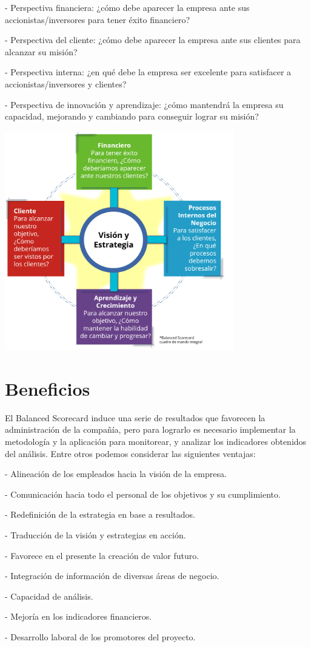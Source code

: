 \item - Perspectiva financiera: ¿cómo debe aparecer la empresa ante sus accionistas/inversores para tener éxito financiero?
\item - Perspectiva del cliente: ¿cómo debe aparecer la empresa ante sus clientes para alcanzar su misión?
\item - Perspectiva interna: ¿en qué debe la empresa ser excelente para satisfacer a accionistas/inversores y clientes?
\item - Perspectiva de innovación y aprendizaje: ¿cómo mantendrá la empresa su capacidad, mejorando y cambiando para conseguir lograr su misión?

\begin{center}
\includegraphics[width=10cm]{./Imagenes/img4}
\end{center}

\section{Beneficios} 
\item{El Balanced Scorecard induce una serie de resultados que favorecen la administración de la compañía, pero para lograrlo es necesario implementar la metodología y la aplicación para monitorear, y analizar los indicadores obtenidos del análisis. Entre otros podemos considerar las siguientes ventajas:}
\\

\item - Alineación de los empleados hacia la visión de la empresa.
\item - Comunicación hacia todo el personal de los objetivos y su cumplimiento.
\item - Redefinición de la estrategia en base a resultados.
\item - Traducción de la visión y estrategias en acción.
\item - Favorece en el presente la creación de valor futuro.
\item - Integración de información de diversas áreas de negocio.
\item - Capacidad de análisis.
\item - Mejoría en los indicadores financieros.
\item - Desarrollo laboral de los promotores del proyecto.

